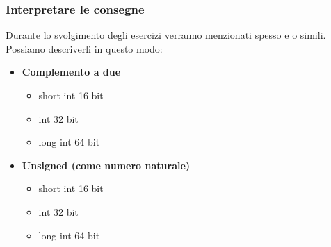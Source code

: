 \documentclass[../main.tex]{subfiles}
\begin{document}
\subsubsection{Interpretare le consegne}
Durante lo svolgimento degli esercizi verranno menzionati spesso  e  o simili. Possiamo 
descriverli in questo modo:
\begin{itemize}
    \item \textbf{Complemento a due}
    \begin{itemize}
        \item short int 16 bit
        \item int 32 bit
        \item long int 64 bit
    \end{itemize}
    \item \textbf{Unsigned (come numero naturale)}
    \begin{itemize}
        \item short int 16 bit
        \item int 32 bit
        \item long int 64 bit
    \end{itemize}
\end{itemize}
\end{document}
